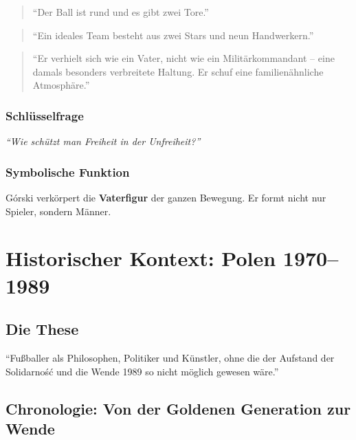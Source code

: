 \documentclass[11pt,a4paper]{book}
\newenvironment{thesenbox}{%
  \begin{mdframed}[
    linecolor=polishred,
    linewidth=2pt,
    backgroundcolor=polishred!5,
    innertopmargin=15pt,
    innerbottommargin=15pt
  ]
  \centering\large\itshape
}{%
  \end{mdframed}
}
\newenvironment{kontextbox}{%
  \begin{mdframed}[
    linecolor=polishred,
    linewidth=1pt,
    backgroundcolor=white,
    leftmargin=20pt,
    rightmargin=20pt
  ]
}{%
  \end{mdframed}
}
\begin{document}
\begin{quote}
``Der Ball ist rund und es gibt zwei Tore.''
\end{quote}

\begin{quote}
``Ein ideales Team besteht aus zwei Stars und neun Handwerkern.''
\end{quote}

\begin{quote}
``Er verhielt sich wie ein Vater, nicht wie ein Militärkommandant -- eine damals besonders verbreitete Haltung. Er schuf eine familienähnliche Atmosphäre.''
\end{quote}

\subsection{Schlüsselfrage}

\begin{kontextbox}
\textit{``Wie schützt man Freiheit in der Unfreiheit?''}
\end{kontextbox}

\subsection{Symbolische Funktion}

Górski verkörpert die \textbf{Vaterfigur} der ganzen Bewegung. Er formt nicht nur Spieler, sondern Männer.


\chapter{Historischer Kontext: Polen 1970--1989}

\section{Die These}

\begin{thesenbox}
``Fußballer als Philosophen, Politiker und Künstler, ohne die der Aufstand der Solidarność und die Wende 1989 so nicht möglich gewesen wäre.''
\end{thesenbox}

\section{Chronologie: Von der Goldenen Generation zur Wende}
\end{document}
